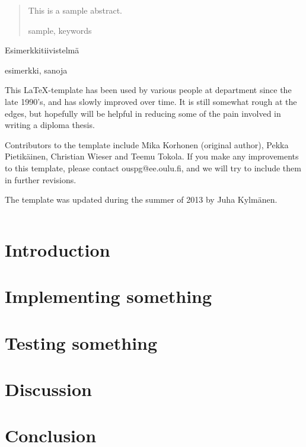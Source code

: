 \documentclass[a4paper, 12pt,titlepage]{dithesis}
\begin{document}

\begin{abstract}
This is a sample abstract.

\keywords sample, keywords

\end{abstract}

\begin{tiivistelma}
Esimerkkitiivistelmä

\avainsanat esimerkki, sanoja
\end{tiivistelma}


\sisluettelo

This \LaTeX -template has been used by various people at department
since the late 1990's, and has slowly improved over time.  It is still
somewhat rough at the edges, but hopefully will be helpful in reducing
some of the pain involved in writing a diploma thesis.

Contributors to the template include Mika Korhonen (original author),
Pekka Pietikäinen, Christian Wieser and Teemu Tokola.  If you make any
improvements to this template, please contact ouspg@ee.oulu.fi, and we
will try to include them in further revisions.

The template was updated during the summer of 2013 by Juha Kylmänen.


\setlongtables
\begin{longtable}[l]{p{3cm}p{}}



\end{longtable}
\setcounter{table}{0}

\chapter{Introduction}
\sivunumerot
\thispagestyle{empty}

\chapter{Implementing something}

\chapter{Testing something}

\chapter{Discussion}

\chapter{Conclusion}



\end{document}
